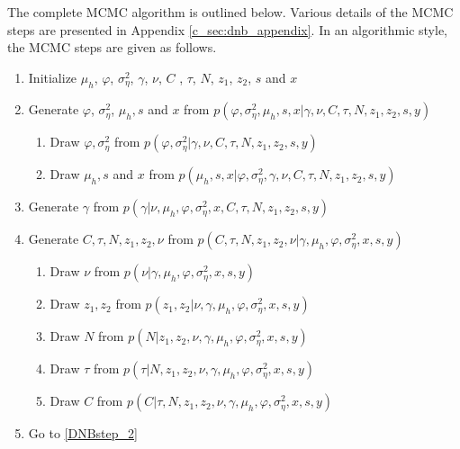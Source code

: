 \documentclass[12pt]{article}
\begin{document}
The complete MCMC algorithm is outlined below.
Various details of the MCMC steps are presented in Appendix \ref{c_sec:dnb_appendix}.
In an algorithmic style, the MCMC steps are given as follows.
\begin{enumerate}
 \item Initialize $\mu_{h}$, $\varphi$, $\sigma^{2}_{\eta}$, $\gamma$, $\nu$, $C$ , $\tau$, $N$, $z_1$, $z_2 $, $s$ and $x$ 
\item \label{DNBstep_2}  Generate $\varphi$, $\sigma^{2}_{\eta}$, $\mu_{h},s$  and $x$  from $p(\varphi, \sigma^{2}_{\eta} ,\mu_{h},s ,x| \gamma, \nu, C, \tau, N,z_1 , z_2, s ,y)$
\begin{enumerate}
\item Draw $\varphi, \sigma^{2}_{\eta}$ from $p(\varphi,\sigma^{2}_{\eta}  | \gamma, \nu, C , \tau, N,z_1 , z_2,s ,y)$
\item Draw $\mu_{h},s$ and $x$ from $p(\mu_{h},s ,x| \varphi,\sigma^{2}_{\eta} ,\gamma, \nu, C, \tau, N,z_1 , z_2,s ,y)$
\end{enumerate}
\item Generate $\gamma$ from $p(\gamma | \nu, \mu_{h} ,\varphi,\sigma^{2}_{\eta},x ,C, \tau, N,z_1 , z_2,s ,y)$
\item Generate $ C , \tau, N, z_1 , z_2, \nu $ from $p(C , \tau, N,z_1 , z_2, \nu |\gamma, \mu_{h} ,\varphi,\sigma^{2}_{\eta},x,s ,y)$
\begin{enumerate}
\item Draw $\nu$ from $p(\nu | \gamma, \mu_{h} ,\varphi,\sigma^{2}_{\eta},x,s,y)$
\item  Draw $z_1 , z_2 $ from $p(z_1 , z_2  |\nu,\gamma,\mu_{h} ,\varphi,\sigma^{2}_{\eta},x,s ,y )$
\item Draw $N$ from $p(N |z_1 , z_2, \nu,\gamma,\mu_{h} ,\varphi,\sigma^{2}_{\eta},x,s ,y )$
\item Draw $\tau$ from $p( \tau |N, z_1 , z_2,\nu,\gamma,\mu_{h} ,\varphi,\sigma^{2}_{\eta},x,s ,y )$
\item Draw $C$ from $p(C | \tau, N,z_1 , z_2,\nu,\gamma, \mu_{h} ,\varphi,\sigma^{2}_{\eta},x,s ,y )$
\end{enumerate}
\item Go to \ref{DNBstep_2}
\end{enumerate} 

 
\end{document}
